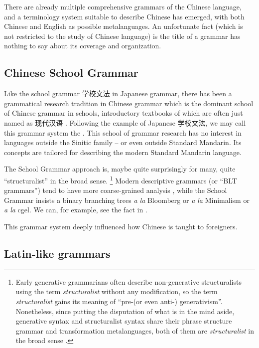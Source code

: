There are already multiple comprehensive grammars of the Chinese language, and a terminology system 
suitable to describe Chinese has emerged, with both Chinese and English as possible metalanguages. 
An unfortunate fact (which is not restricted to the study of Chinese language) is the title of a grammar
has nothing to say about its coverage and organization. 

\subsection{Chinese School Grammar}\label{sec:school-grammar}

Like the school grammar 学校文法 in Japanese grammar, there has been a grammatical research tradition 
in Chinese grammar which is the dominant school of Chinese grammar in schools, introductory textbooks of 
which are often just named as 现代汉语 \citep[e.g.][]{xianhan2004}. Following the example of Japanese 
学校文法, we may call this grammar system the .
This school of grammar research has no interest in languages outside the Sinitic family -- or even outside 
Standard Mandarin. Its concepts are tailored for describing the modern Standard Mandarin language. 

The School Grammar approach is, maybe quite surprisingly for many, quite ``structuralist'' in the broad 
sense.%
\footnote{
    Early generative grammarians often describe non-generative structuralists using the term \emph{structuralist}
    without any modification, so the term \emph{structuralist} gains its meaning of ``pre-(or even anti-)
    generativism''. Nonetheless, since putting the disputation of what is in the mind aside, 
    generative syntax and structuralist syntax share their phrase structure grammar and transformation 
    metalanguages, both of them are \emph{structuralist} in the broad sense \citep{newmeyer1986has}.
}
Modern descriptive grammars (or ``BLT grammars'') tend to have more coarse-grained analysis \citep{dryer2006descriptive},
while the School Grammar insists a binary branching trees \emph{a la} Bloomberg or \emph{a la} Minimalism
or \emph{a la} \ac{cgel}. We can, for example, see the fact in .

This grammar system deeply influenced how Chinese is taught to foreigners. %

\subsection{Latin-like grammars}

